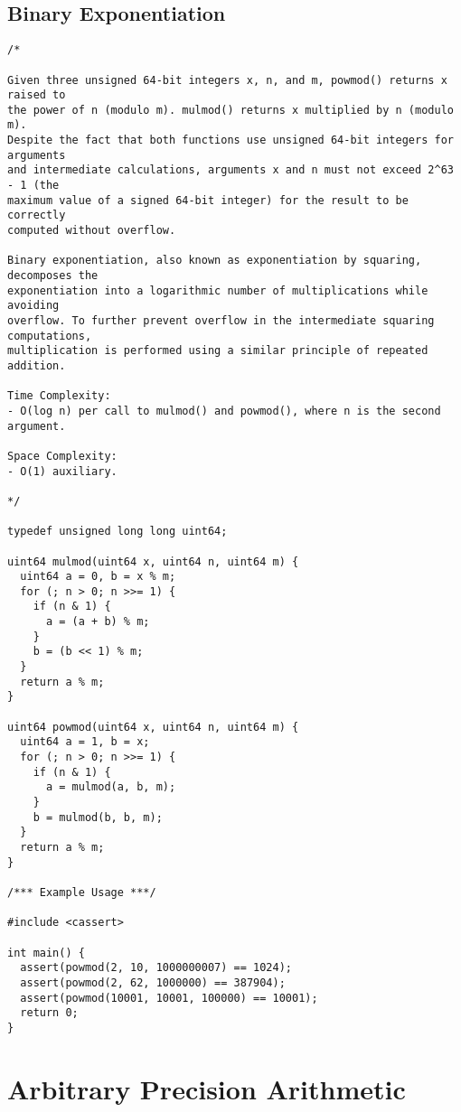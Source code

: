 \subsection{Binary Exponentiation}
\begin{lstlisting}
/*

Given three unsigned 64-bit integers x, n, and m, powmod() returns x raised to
the power of n (modulo m). mulmod() returns x multiplied by n (modulo m).
Despite the fact that both functions use unsigned 64-bit integers for arguments
and intermediate calculations, arguments x and n must not exceed 2^63 - 1 (the
maximum value of a signed 64-bit integer) for the result to be correctly
computed without overflow.

Binary exponentiation, also known as exponentiation by squaring, decomposes the
exponentiation into a logarithmic number of multiplications while avoiding
overflow. To further prevent overflow in the intermediate squaring computations,
multiplication is performed using a similar principle of repeated addition.

Time Complexity:
- O(log n) per call to mulmod() and powmod(), where n is the second argument.

Space Complexity:
- O(1) auxiliary.

*/

typedef unsigned long long uint64;

uint64 mulmod(uint64 x, uint64 n, uint64 m) {
  uint64 a = 0, b = x % m;
  for (; n > 0; n >>= 1) {
    if (n & 1) {
      a = (a + b) % m;
    }
    b = (b << 1) % m;
  }
  return a % m;
}

uint64 powmod(uint64 x, uint64 n, uint64 m) {
  uint64 a = 1, b = x;
  for (; n > 0; n >>= 1) {
    if (n & 1) {
      a = mulmod(a, b, m);
    }
    b = mulmod(b, b, m);
  }
  return a % m;
}

/*** Example Usage ***/

#include <cassert>

int main() {
  assert(powmod(2, 10, 1000000007) == 1024);
  assert(powmod(2, 62, 1000000) == 387904);
  assert(powmod(10001, 10001, 100000) == 10001);
  return 0;
}
\end{lstlisting}

\section{Arbitrary Precision Arithmetic}
\setcounter{section}{4}
\setcounter{subsection}{0}

